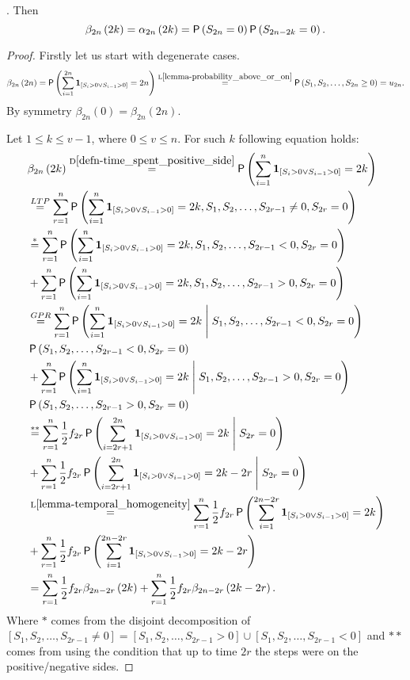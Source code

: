 \begin{thm}\label{thm-arcsine_sojourn_times}
 \Lrws. Then
 \[
 \beta_{2n} \left( 2k \right) =\alpha_{2n} \left( 2k \right)=\operatorname{\mathsf{P}}\left( S_{2n}=0\right)\operatorname{\mathsf{P}}\left( S_{2n-2k}=0\right).
 \]
\end{thm}
\begin{proof}%
 Firstly let us start with degenerate cases.
 \[
    \beta_{2n} \left( 2n \right)
    =\pr \left( \suma[i][1][2n] \indikator{S_i>0 \lor S_{i-1}>0}=2n \right)
    \overset{\text{L}\ref{lemma-probability_above_or_on}}{=}\pr \left( S_1, S_2, \ldots, S_{2n}\geq 0 \right) =u_{2n}.
 \]
 By symmetry $\beta_{2n} \left( 0 \right) =\beta_{2n} \left( 2n \right).$

 Let $1 \leq k \leq v-1$, where $0\leq v \leq n$. For such $k$ following equation holds:
 \[
  \begin{split}
    & \beta_{2n} \left( 2k \right) \overset{\text{D}\ref{defn-time_spent_positive_side}}{=} \pr \left( \suma \indikator{S_i>0 \lor S_{i-1}>0}=2k \right)\\
    & \ltp \suma[r][1][n]\pr \left( \suma \indikator{S_i>0 \lor S_{i-1}>0}=2k, S_1, S_2, \ldots, S_{2r-1}\neq 0, S_{2r}=0 \right)\\
    & \overset{*}{=} \suma[r][1][n]\pr \left( \suma \indikator{S_i>0 \lor S_{i-1}>0}=2k, S_1, S_2, \ldots, S_{2r-1}< 0, S_{2r}=0 \right)\\
    & +\suma[r][1][n]\pr \left( \suma \indikator{S_i>0 \lor S_{i-1}>0}=2k, S_1, S_2, \ldots, S_{2r-1}> 0, S_{2r}=0 \right)\\
    & \gpr \suma[r][1][n]\pr \left( \suma \indikator{S_i>0 \lor S_{i-1}>0}=2k \Mid S_1, S_2, \ldots, S_{2r-1}< 0, S_{2r}=0 \right)\\
    & \pr \left( S_1, S_2, \ldots, S_{2r-1}< 0, S_{2r}=0 \right)\\
    & +\suma[r][1][n]\pr \left( \suma \indikator{S_i>0 \lor S_{i-1}>0}=2k \Mid S_1, S_2, \ldots, S_{2r-1}> 0, S_{2r}=0 \right)\\
    & \pr \left( S_1, S_2, \ldots, S_{2r-1}>0, S_{2r}=0 \right)\\
    & \overset{**}{=} \suma[r][1][n] \h f_{2r} \pr \left( \suma[i][2r+1][2n] \indikator{S_i>0 \lor S_{i-1}>0}=2k \Mid S_{2r}=0 \right)\\
    & + \suma[r][1][n] \h f_{2r} \pr \left( \suma[i][2r+1][2n] \indikator{S_i>0 \lor S_{i-1}>0}=2k-2r \Mid S_{2r}=0 \right)\\
    &\overset{\text{L}\ref{lemma-temporal_homogeneity}}{=} \suma[r][1][n] \h f_{2r} \pr \left( \suma[i][1][2n-2r] \indikator{S_i>0 \lor S_{i-1}>0}=2k\right)\\
    &+ \suma[r][1][n] \h f_{2r} \pr \left( \suma[i][1][2n-2r] \indikator{S_i>0 \lor S_{i-1}>0}=2k-2r\right)\\
    &=\suma[r][1][n] \h f_{2r} \beta_{2n-2r}\left(2k\right)+\suma[r][1][n] \h f_{2r}\beta_{2n-2r}\left(2k-2r\right).
  \end{split}
 \]
 Where $*$ comes from the disjoint decomposition of $[S_1, S_2, \ldots, S_{2r-1}\neq 0]=[S_1, S_2, \ldots, S_{2r-1}> 0]\cup[S_1, S_2, \ldots, S_{2r-1}<0]$ and $**$ comes from using the condition that up to time $2r$ the steps were on the positive/negative sides.


\end{proof}
